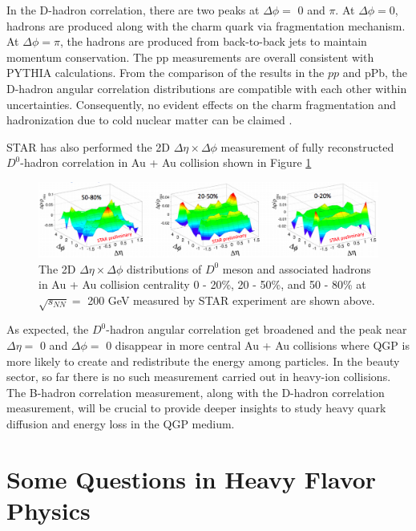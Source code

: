 In the D-hadron correlation, there are two peaks at $\Delta \phi =$ 0 and $\pi$. At $\Delta \phi = $0, hadrons are produced along with the charm quark via fragmentation mechanism. At $\Delta \phi = \pi$, the hadrons are produced from back-to-back jets to maintain momentum conservation. The pp measurements are overall consistent with PYTHIA calculations. From the comparison of the results in the $pp$ and pPb, the D-hadron angular correlation distributions are compatible with each other within uncertainties. Consequently, no evident effects on the charm fragmentation and hadronization due to cold nuclear matter can be claimed  \cite{DHadronRef}. 

STAR has also performed the 2D $\Delta \eta \times \Delta \phi$ measurement of fully reconstructed $D^0$-hadron correlation in Au + Au collision \cite{DHadronSTAR} shown in Figure \ref{STARDHadron}

\begin{figure}[hbtp]
\begin{center}
\includegraphics[width=1.05\textwidth]{Figures/Chapter2/STARDHadron.png}
\caption{The 2D $\Delta \eta \times \Delta \phi$ distributions of $D^0$ meson and associated hadrons in Au + Au collision centrality 0 - 20\%, 20 - 50\%, and 50 - 80\% at $\sqrt{s_{NN}} = $ 200 GeV measured by STAR experiment are shown above.}
\label{STARDHadron}
\end{center}
\end{figure} 

As expected, the $D^0$-hadron angular correlation get broadened and the peak near $\Delta \eta = $ 0 and $\Delta \phi = $ 0 disappear in more central Au + Au collisions where QGP is more likely to create and redistribute the energy among particles. In the beauty sector, so far there is no such measurement carried out in heavy-ion collisions. The B-hadron correlation measurement, along with the D-hadron correlation measurement, will be crucial to provide deeper insights to study heavy quark diffusion and energy loss in the QGP medium. 

\section{Some Questions in Heavy Flavor Physics}

